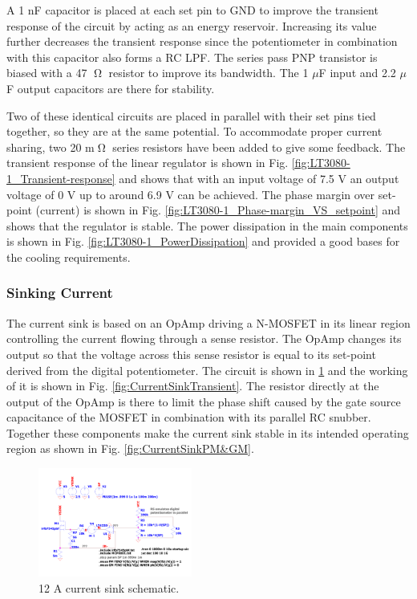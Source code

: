 A 1 nF capacitor is placed at each set pin to GND to improve the transient response of the circuit by acting as an energy reservoir. Increasing its value further decreases the transient response since the potentiometer in combination with this capacitor also forms a RC LPF. The series pass PNP transistor is biased with a 47 $\tcohm$ resistor to improve its bandwidth. The 1 $\mu$F input and 2.2 $\mu$F output capacitors are there for stability.

Two of these identical circuits are placed in parallel with their set pins tied together, so they are at the same potential. To accommodate proper current sharing, two 20 m$\tcohm$ series resistors have been added to give some feedback.
The transient response of the linear regulator is shown in Fig. \ref{fig:LT3080-1_Transient-response} and shows that with an input voltage of 7.5 V an output voltage of 0 V up to around 6.9 V can be achieved. The phase margin over set-point (current) is shown in Fig. \ref{fig:LT3080-1_Phase-margin_VS_setpoint} and shows that the regulator is stable. The power dissipation in the main components is shown in Fig. \ref{fig:LT3080-1_PowerDissipation} and provided a good bases for the cooling requirements.

\subsubsection{Sinking Current}
The current sink is based on an OpAmp driving a N-MOSFET in its linear region controlling the current flowing through a sense resistor. The OpAmp changes its output so that the voltage across this sense resistor is equal to its set-point derived from the digital potentiometer. The circuit is shown in \ref{fig:CurrentSinkSchematic} and the working of it is shown in Fig. \ref{fig:CurrentSinkTransient}. The resistor directly at the output of the OpAmp is there to limit the phase shift caused by the gate source capacitance of the MOSFET in combination with its parallel RC snubber. Together these components make the current sink stable in its intended operating region as shown in Fig. \ref{fig:CurrentSinkPM&GM}.

\begin{figure}[h!]
    \centering
    \includegraphics[width=0.45\textwidth]{CurrentSinkSchematic.pdf}
    \caption{12 A current sink schematic.}
    \label{fig:CurrentSinkSchematic}
\end{figure}

